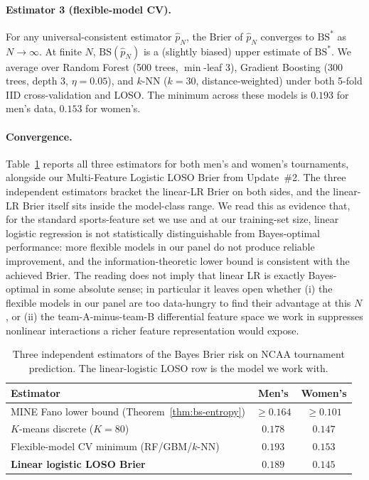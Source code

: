 \documentclass[11pt,a4paper]{article}
\theoremstyle{definition}
\newcommand{\BS}{\mathrm{BS}}
\begin{document}
\paragraph{Estimator 3 (flexible-model CV).} For any universal-consistent estimator $\hat{p}_N$, the Brier of $\hat{p}_N$ converges to $\BS^*$ as $N \to \infty$. At finite $N$, $\BS(\hat{p}_N)$ is a (slightly biased) upper estimate of $\BS^*$. We average over Random Forest (500 trees, $\min$-leaf 3), Gradient Boosting (300 trees, depth 3, $\eta = 0.05$), and $k$-NN ($k = 30$, distance-weighted) under both 5-fold IID cross-validation and LOSO. The minimum across these models is $0.193$ for men's data, $0.153$ for women's.

\paragraph{Convergence.} Table~\ref{tab:ceiling-convergence} reports all three estimators for both men's and women's tournaments, alongside our Multi-Feature Logistic LOSO Brier from Update~\#2. The three independent estimators bracket the linear-LR Brier on both sides, and the linear-LR Brier itself sits inside the model-class range. We read this as evidence that, for the standard sports-feature set we use and at our training-set size, linear logistic regression is not statistically distinguishable from Bayes-optimal performance: more flexible models in our panel do not produce reliable improvement, and the information-theoretic lower bound is consistent with the achieved Brier. The reading does not imply that linear LR is exactly Bayes-optimal in some absolute sense; in particular it leaves open whether (i) the flexible models in our panel are too data-hungry to find their advantage at this $N$, or (ii) the team-A-minus-team-B differential feature space we work in suppresses nonlinear interactions a richer feature representation would expose.

\begin{table}[h]
\centering
\caption{Three independent estimators of the Bayes Brier risk on NCAA tournament prediction. The linear-logistic LOSO row is the model we work with.}
\label{tab:ceiling-convergence}
\small
\begin{tabular}{@{}lcc@{}}
\toprule
Estimator & Men's & Women's \\
\midrule
MINE Fano lower bound (Theorem~\ref{thm:bs-entropy}) & $\ge 0.164$ & $\ge 0.101$ \\
$K$-means discrete ($K=80$) & $0.178$ & $0.147$ \\
Flexible-model CV minimum (RF/GBM/$k$-NN) & $0.193$ & $0.153$ \\
\midrule
\textbf{Linear logistic LOSO Brier} & $\mathbf{0.189}$ & $\mathbf{0.145}$ \\
\bottomrule
\end{tabular}
\end{table}
\end{document}
